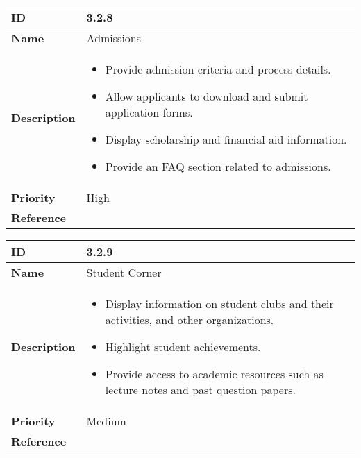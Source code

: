 \begin{center}
\begin{tabular}{ | >{\bfseries}m{5em} | m{10cm} |  } 
  \hline
  ID & 3.2.8\\  
  \hline
  Name & Admissions \\  
  \hline
  Description & 
  \begin{itemize}
      \item Provide admission criteria and process details.
      \item Allow applicants to download and submit application forms.
      \item Display scholarship and financial aid information.
      \item Provide an FAQ section related to admissions.
  \end{itemize} \\  
  \hline
  Priority & High\\
  \hline 
  Reference & \\
  \hline
\end{tabular}
\end{center}

\vspace{0.5cm}


\begin{center}
\begin{tabular}{ | >{\bfseries}m{5em} | m{10cm} |  } 
  \hline
  ID & 3.2.9\\  
  \hline
  Name & Student Corner \\  
  \hline
  Description & 
  \begin{itemize}
      \item Display information on student clubs and their activities, and other organizations.
      \item Highlight student achievements.
      \item Provide access to academic resources such as lecture notes and past question papers.
  \end{itemize} \\ 
  \hline
  Priority & Medium\\
  \hline 
  Reference & \\
  \hline
\end{tabular}
\end{center}

\vspace{0.5cm}

